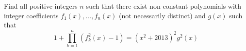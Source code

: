Find all positive integers $n$ such that there exist non-constant polynomials with integer coefficients $f_1(x),...,f_n(x)$ (not necessarily distinct) and $g(x)$ such that $$1 + \prod_{k=1}^{n}\left(f^2_k(x)-1\right)=(x^2+2013)^2g^2(x)$$